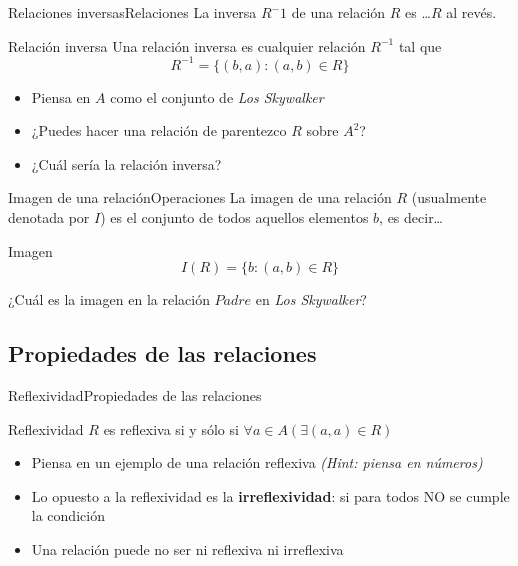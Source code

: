\documentclass[spanish, c]{beamer}
\begin{document}
\begin{frame}{Relaciones inversas}{Relaciones}
    La \alert{inversa} $R^-1$ de una relación $R$ es \dots $R$ al revés.

    \bigskip
    
    \begin{block}{Relación inversa}
        Una relación inversa es cualquier relación $R^{-1}$ tal que
        $$R^{-1} = \{(b, a) : (a, b) \in R\}$$
    \end{block} \pause

    \bigskip

    \begin{itemize}
        \item Piensa en $A$ como el conjunto de \textit{Los Skywalker} \pause
        \item ¿Puedes hacer una relación de parentezco $R$ sobre $A^2$? \pause
        \item ¿Cuál sería la relación inversa?
    \end{itemize}

\end{frame}

\begin{frame}{Imagen de una relación}{Operaciones}
    La \alert{imagen} de una relación $R$ (usualmente denotada por $I$) es el conjunto de todos aquellos elementos $b$, es decir\dots \pause

    \bigskip

    \begin{block}{Imagen}
        $$I(R) = \{b : (a, b) \in R\}$$
    \end{block} \pause

    \bigskip

    ¿Cuál es la imagen en la relación $Padre$ en \textit{Los Skywalker}?
\end{frame}

\subsection{Propiedades de las relaciones}

\begin{frame}{Reflexividad}{Propiedades de las relaciones}
    
    \begin{block}{Reflexividad}
        $R$ es \alert{reflexiva} si y sólo si $\forall a \in A \left( \exists (a, a) \in R \right)$
    \end{block} \pause

    \bigskip

    \begin{itemize}
        \item Piensa en un ejemplo de una relación reflexiva \textit{(Hint: piensa en números)}
        \item Lo opuesto a la reflexividad es la \textbf{irreflexividad}: si para todos NO se cumple la condición
        \item Una relación puede no ser ni reflexiva ni irreflexiva
    \end{itemize}

\end{frame}
\end{document}
